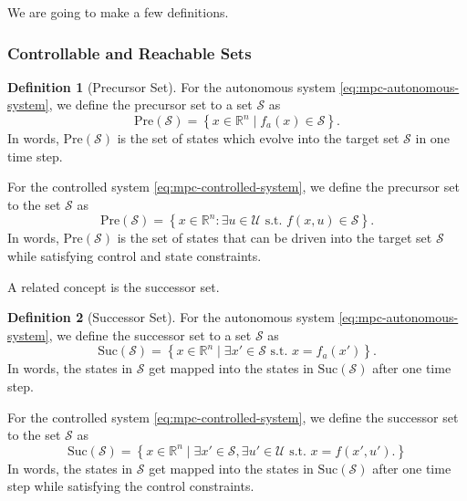 \documentclass[
]{book}
\theoremstyle{definition}
\newtheorem{definition}{Definition}[chapter]
\theoremstyle{definition}
\theoremstyle{definition}
\theoremstyle{definition}
\theoremstyle{remark}
\begin{document}
We are going to make a few definitions.

\hypertarget{controllable-and-reachable-sets}{%
\subsubsection{Controllable and Reachable Sets}\label{controllable-and-reachable-sets}}

\begin{definition}[Precursor Set]
\protect\hypertarget{def:precursor-set}{}\label{def:precursor-set}For the autonomous system \eqref{eq:mpc-autonomous-system}, we define the precursor set to a set \(\mathcal{S}\) as
\[
\text{Pre}(\mathcal{S}) = \left\{ x \in \mathbb{R}^n \mid f_a(x) \in \mathcal{S} \right\}.
\]
In words, \(\text{Pre}(\mathcal{S})\) is the set of states which evolve into the target set \(\mathcal{S}\) in one time step.

For the controlled system \eqref{eq:mpc-controlled-system}, we define the precursor set to the set \(\mathcal{S}\) as
\[
\text{Pre}(\mathcal{S}) = \left\{ x \in \mathbb{R}^n : \exists u \in \mathcal{U} \text{  s.t. } f(x,u) \in \mathcal{S} \right\}.
\]
In words, \(\text{Pre}(\mathcal{S})\) is the set of states that can be driven into the target set \(\mathcal{S}\) while satisfying control and state constraints.
\end{definition}

A related concept is the successor set.

\begin{definition}[Successor Set]
\protect\hypertarget{def:successor-set}{}\label{def:successor-set}For the autonomous system \eqref{eq:mpc-autonomous-system}, we define the successor set to a set \(\mathcal{S}\) as
\[
\text{Suc}(\mathcal{S}) = \left\{ x \in \mathbb{R}^n \mid \exists x' \in \mathcal{S} \text{ s.t. } x = f_a(x')\right\}.
\]
In words, the states in \(\mathcal{S}\) get mapped into the states in \(\text{Suc}(\mathcal{S})\) after one time step.

For the controlled system \eqref{eq:mpc-controlled-system}, we define the successor set to the set \(\mathcal{S}\) as
\[
\text{Suc}(\mathcal{S}) = \left\{ x \in \mathbb{R}^n \mid \exists x' \in \mathcal{S}, \exists u' \in \mathcal{U} \text{ s.t. } x = f(x',u'). \right\}
\]
In words, the states in \(\mathcal{S}\) get mapped into the states in \(\text{Suc}(\mathcal{S})\) after one time step while satisfying the control constraints.
\end{definition}
\end{document}
